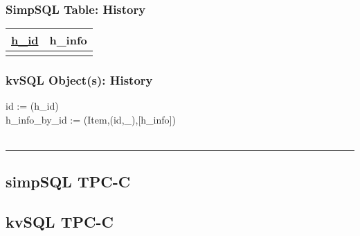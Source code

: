 \documentclass[12pt,letter]{article}
\begin{document}
\subsubsection*{SimpSQL Table: History}  
\begin{tabular}{ |c|c| }
 \hline
 \underline{h\_id} & h\_info\\
 \hline
 &   \\
 \hline
\end{tabular}

\subsubsection*{kvSQL Object(s): History}  
id := (h\_id)\\
 h\_info\_by\_id := 
(Item,(id,\_),[h\_info]) \\
\\
\hrule









\subsection*{simpSQL TPC-C}





\subsection*{kvSQL TPC-C}


\newpage
\end{document}

